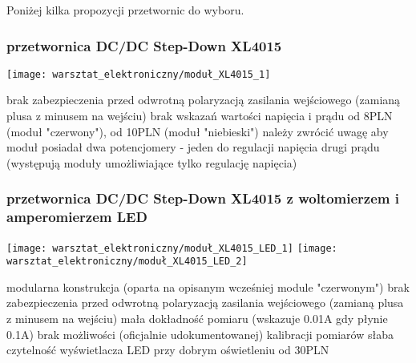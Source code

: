 Poniżej kilka propozycji przetwornic do wyboru.

\subsubsection{przetwornica DC/DC Step-Down XL4015}
	\begin{center}
		\texttt{[image: warsztat\_elektroniczny/moduł\_XL4015\_1]}
	\end{center}
	\begin{itemize}
		\wada brak zabezpieczenia przed odwrotną polaryzacją zasilania wejściowego (zamianą plusa z minusem na wejściu)
		\wada brak wskazań wartości napięcia i prądu
		\info od 8PLN (moduł "czerwony"), od 10PLN (moduł "niebieski")
		\uwaga należy zwrócić uwagę aby moduł posiadał dwa potencjomery - jeden do regulacji napięcia drugi prądu (występują moduły umożliwiające tylko regulację napięcia)
	\end{itemize}

\subsubsection{przetwornica DC/DC Step-Down XL4015 z woltomierzem i amperomierzem LED}
	\begin{center}
		\texttt{[image: warsztat\_elektroniczny/moduł\_XL4015\_LED\_1]}
		\hspace{0.5cm}
		\texttt{[image: warsztat\_elektroniczny/moduł\_XL4015\_LED\_2]}
	\end{center}

	\begin{itemize}
		\zaleta modularna konstrukcja (oparta na opisanym wcześniej module "czerwonym")
		\wada brak zabezpieczenia przed odwrotną polaryzacją zasilania wejściowego (zamianą plusa z minusem na wejściu)
		\wada mała dokładność pomiaru (wskazuje 0.01A gdy płynie 0.1A)
		\wada brak możliwości (oficjalnie udokumentowanej) kalibracji pomiarów
		\wada słaba czytelność wyświetlacza LED przy dobrym oświetleniu
		\info od 30PLN
	\end{itemize}
	
